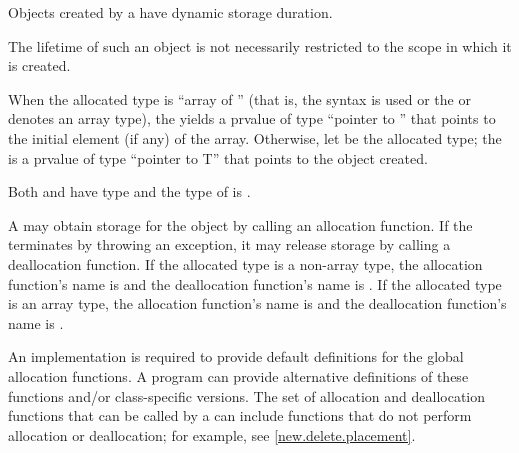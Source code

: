 \pnum
{}%
Objects created by a  have dynamic storage
duration.
\begin{note}
%
The lifetime of such an object is not necessarily restricted to the
scope in which it is created.
\end{note}

\pnum
{}%
When the allocated type is ``array of  ''
(that is, the  syntax is used or the
 or  denotes an array type),
the  yields a prvalue of type ``pointer to ''
that points to the initial element (if any) of the array.
Otherwise, let  be the allocated type;
the 
is a prvalue of type ``pointer to T''
that points to the object created.
\begin{note}
Both  and  have type  and
the type of  is .
\end{note}

\pnum
A  may obtain storage for the object by calling an
allocation function. If
the  terminates by throwing an exception, it
may release storage by calling a deallocation
function. If the allocated type
is a non-array type, the allocation function's name is
%
%
 and the deallocation function's name is
. If the allocated type is an array type, the
allocation function's name is
%
%
and the deallocation function's name is
.
\begin{note}
An implementation is required to provide default definitions for the global
allocation
functions.
A \Cpp{} program can provide alternative definitions of
these functions and/or class-specific
versions.
The set of allocation and deallocation functions that can be called
by a 
can include functions that do not perform allocation or deallocation;
for example, see \ref{new.delete.placement}.
\end{note}

